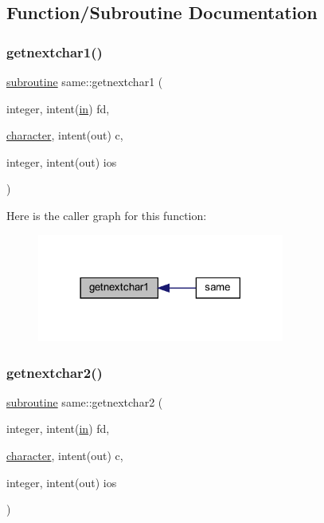 \subsection{Function/\+Subroutine Documentation}
\mbox{\label{__cmp_8f90_a8bfff852996edc0f1e98b9ad7cd83dae}} 
\subsubsection{\texorpdfstring{getnextchar1()}{getnextchar1()}}
{\footnotesize\ttfamily \hyperlink{M__stopwatch_83_8txt_acfbcff50169d691ff02d4a123ed70482}{subroutine} same\+::getnextchar1 (\begin{DoxyParamCaption}\item[{integer, intent(\hyperlink{M__journal_83_8txt_afce72651d1eed785a2132bee863b2f38}{in})}]{fd,  }\item[{\hyperlink{option__stopwatch_83_8txt_abd4b21fbbd175834027b5224bfe97e66}{character}, intent(out)}]{c,  }\item[{integer, intent(out)}]{ios }\end{DoxyParamCaption})}

Here is the caller graph for this function\+:
\nopagebreak
\begin{figure}[H]
\begin{center}
\leavevmode
\includegraphics[width=230pt]{__cmp_8f90_a8bfff852996edc0f1e98b9ad7cd83dae_icgraph}
\end{center}
\end{figure}
\mbox{\label{__cmp_8f90_acbf875fdb593609438c33f5b8182e7d4}} 
\subsubsection{\texorpdfstring{getnextchar2()}{getnextchar2()}}
{\footnotesize\ttfamily \hyperlink{M__stopwatch_83_8txt_acfbcff50169d691ff02d4a123ed70482}{subroutine} same\+::getnextchar2 (\begin{DoxyParamCaption}\item[{integer, intent(\hyperlink{M__journal_83_8txt_afce72651d1eed785a2132bee863b2f38}{in})}]{fd,  }\item[{\hyperlink{option__stopwatch_83_8txt_abd4b21fbbd175834027b5224bfe97e66}{character}, intent(out)}]{c,  }\item[{integer, intent(out)}]{ios }\end{DoxyParamCaption})}

